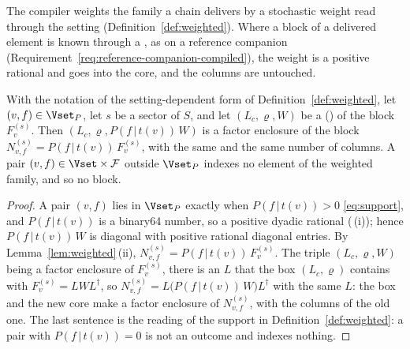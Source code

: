 
The compiler weights the family a chain delivers by a stochastic weight read
through the setting (Definition~\ref{def:weighted}). Where a block of a
delivered element is known through a , as on a reference
companion (Requirement~\ref{req:reference-companion-compiled}), the weight is
a positive rational and goes into the core, and the columns are untouched.

\begin{lemma}\label{lem:weighted-factor}
With the notation of the setting-dependent form of
Definition~\ref{def:weighted}, let $(v,f)\in\Vset_P$, let $s$ be a sector of
$S$, and let $(L_c,\varrho,W)$ be a 
() of the block $F^{(s)}_v$. Then
$(L_c,\varrho,P(f\,|\,t(v))\,W)$ is a factor enclosure of the block
$N^{(s)}_{v,f}=P(f\,|\,t(v))\,F^{(s)}_v$, with the same
 and the same number of columns. A pair $(v,f)\in\Vset\times\mathcal{F}$ outside
$\Vset_P$ indexes no element of the weighted family, and so no block.
\end{lemma}

\begin{proof}
A pair $(v,f)$ lies in $\Vset_P$ exactly when $P(f\,|\,t(v))>0$
\eqref{eq:support}, and $P(f\,|\,t(v))$ is a binary64 number, so a positive
dyadic rational (\,(i)); hence
$P(f\,|\,t(v))\,W$ is diagonal with positive rational diagonal entries. By
Lemma~\ref{lem:weighted}\,(ii), $N^{(s)}_{v,f}=P(f\,|\,t(v))\,F^{(s)}_v$. The
triple $(L_c,\varrho,W)$ being a factor enclosure of $F^{(s)}_v$, there is an
$L$ that the box $(L_c,\varrho)$ contains with $F^{(s)}_v=LWL^{\dagger}$, so
$N^{(s)}_{v,f}=L\big(P(f\,|\,t(v))\,W\big)L^{\dagger}$ with the same $L$: the
box and the new core make a factor enclosure of $N^{(s)}_{v,f}$, with the
columns of the old one. The last sentence is the reading of the support in
Definition~\ref{def:weighted}: a pair with $P(f\,|\,t(v))=0$ is not an
outcome and indexes nothing.
\end{proof}
